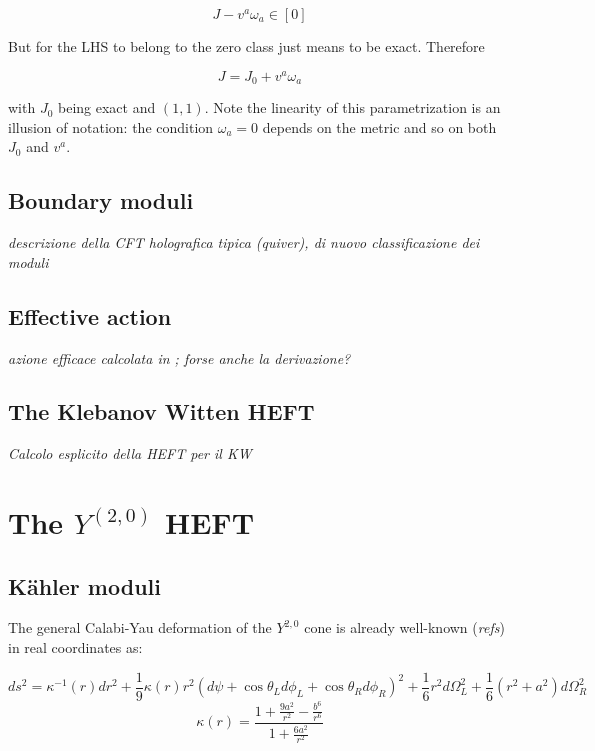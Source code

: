 \documentclass[11pt,a4paper,oneside,openright,titlepage]{book}
\newcommand{\cmmnt}[1]{\textcolor{Mahogany}{\emph{#1}}}
\begin{document}
\begin{equation}
	J - v^a \omega_a \in [0]
\end{equation}

But for the LHS to belong to the zero class just means to be exact. Therefore

\begin{equation}
	J = J_0 + v^a \omega_a \label{JandJ0}
\end{equation}

with $J_0$ being exact and $(1,1)$. Note the linearity of this parametrization is an illusion of notation: the condition $\omega_a = 0$ depends on the metric and so on both $J_0$ and $v^a$.


\section{Boundary moduli}

\cmmnt{descrizione della CFT holografica tipica (quiver), di nuovo classificazione dei moduli}

\section{Effective action}

\cmmnt{azione efficace calcolata in \cite{MZ}; forse anche la derivazione?}

\section{The Klebanov Witten HEFT}

\cmmnt{Calcolo esplicito della HEFT per il KW}

\chapter{The $Y^{(2,0)}$ HEFT}

\section{K\"ahler moduli}

The general Calabi-Yau deformation of the $Y^{2,0}$ cone is already well-known (\cmmnt{refs}) in real coordinates as:

\begin{equation}
ds^2 = \kappa^{-1}(r)dr^2 + \frac{1}{9} \kappa(r) r^2 (d\psi + \cos\theta_L d\phi_L + \cos\theta_R d\phi_R)^2 + \frac{1}{6} r^2 d\Omega_L^2 + \frac{1}{6}(r^2+a^2) d\Omega_R^2 \label{y20metric} \end{equation}
\begin{equation}
	\kappa(r) = \frac{1 + \frac{9a^2}{r^2} - \frac{b^6}{r^6}}{1+ \frac{6a^2}{r^2}}
\end{equation}
\end{document}
